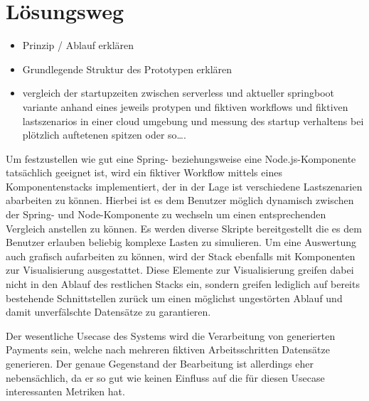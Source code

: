 \section{Lösungsweg}
\begin{itemize}
  \item Prinzip / Ablauf erklären
  \item Grundlegende Struktur des Prototypen erklären
  \item vergleich der startupzeiten zwischen serverless und aktueller springboot variante anhand eines jeweils protypen und fiktiven workflows und fiktiven lastszenarios in einer cloud umgebung und messung des startup verhaltens bei plötzlich auftetenen spitzen oder so….
\end{itemize}

Um festzustellen wie gut eine Spring- beziehungsweise eine Node.js-Komponente tatsächlich geeignet ist, wird ein fiktiver Workflow mittels eines Komponentenstacks implementiert, der in der Lage ist verschiedene Lastszenarien abarbeiten zu können. Hierbei ist es dem Benutzer möglich dynamisch zwischen der Spring- und Node-Komponente zu wechseln um einen entsprechenden Vergleich anstellen zu können. Es werden diverse Skripte bereitgestellt die es dem Benutzer erlauben beliebig komplexe Lasten zu simulieren. Um eine Auswertung auch grafisch aufarbeiten zu können, wird der Stack ebenfalls mit Komponenten zur Visualisierung ausgestattet. Diese Elemente zur Visualisierung greifen dabei nicht in den Ablauf des restlichen Stacks ein, sondern greifen lediglich auf bereits bestehende Schnittstellen zurück um einen möglichst ungestörten Ablauf und damit unverfälschte Datensätze zu garantieren. 

Der wesentliche Usecase des Systems wird die Verarbeitung von generierten Payments sein, welche nach mehreren  fiktiven Arbeitsschritten Datensätze generieren. Der genaue Gegenstand der Bearbeitung ist allerdings eher nebensächlich, da er so gut wie keinen Einfluss auf die für diesen Usecase interessanten Metriken hat. 




